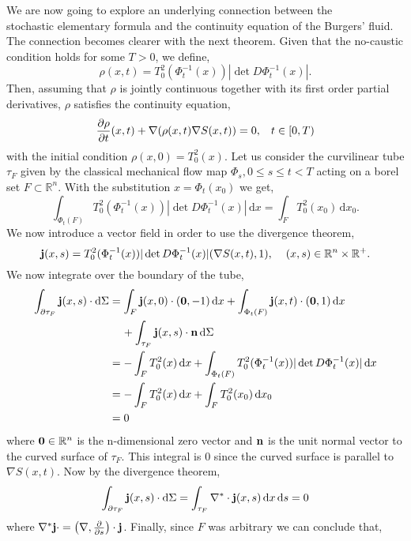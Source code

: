 \documentclass[a4paper,12pt,draft]{report}
\theoremstyle{remark}
\theoremstyle{definition}
\begin{document}
We are now going to explore an underlying connection between the \\stochastic elementary formula and the continuity equation of the Burgers' fluid.  The connection becomes clearer with the next theorem.
\theorem
{
Given that the no-caustic condition holds for some $T > 0$, we define,
$$
\rho(x, t) = T_0^2(\Phi_t^{-1}(x))|\det D\Phi_t^{-1}(x)|.
$$
Then, assuming that $\rho$ is jointly continuous together with its first order partial derivatives, $\rho$ satisfies the continuity equation,
$$
\frac{\partial \rho}{\partial t}(x, t) + \nabla(\rho(x, t)\nabla S(x, t)) = 0, \hspace{0.3cm} t \in [0, T)
$$
with the initial condition $\rho(x, 0) = T_0^2(x)$.
}
\proof
{
Let us consider the curvilinear tube $\tau_F$ given by the classical mechanical flow map $\Phi_s, 0 \le s\le t < T$ acting on a borel set $F \subset \mathbb{R}^n$.
With the substitution $x = \Phi_t(x_0)$ we get,
$$
\int_{\Phi_t(F)} T_0^2(\Phi_t^{-1}(x))|\det D\Phi_t^{-1}(x)|\,\mathrm{d}x = \int_F T_0^2(x_0)\,\mathrm{d}x_0.
$$
We now introduce a vector field in order to use the divergence theorem,
$$
\bold{j}(x, s) = T_0^2(\Phi_t^{-1}(x))|\det D\Phi_t^{-1}(x)|(\nabla S(x, t), 1), \hspace{0.4cm}(x, s) \in \mathbb{R}^n \times \mathbb{R}^+.
$$
We now integrate over the boundary of the tube,
\begin{align}
\int_{\partial \tau_F} \bold{j}(x, s)\cdot \mathrm{d}\Sigma & = \int_F \bold{j}(x, 0)\cdot(\bold{0}, -1)\,\mathrm{d}x + \int_{\Phi_t(F)} \bold{j}(x, t)\cdot(\bold{0}, 1)\,\mathrm{d}x \nonumber\\
& \hspace{0.4cm} + \int_{\tau_F} \bold{j}(x, s)\cdot \bold{n}\,\mathrm{d}\Sigma \nonumber\\
& = -\int_F T_0^2(x)\,\mathrm{d}x + \int_{\Phi_t(F)} T_0^2(\Phi_t^{-1}(x))|\det D\Phi_t^{-1}(x)|\,\mathrm{d}x\nonumber\\
& = -\int_F T_0^2(x)\,\mathrm{d}x + \int_F T_0^2(x_0)\,\mathrm{d}x_0\nonumber\\
& = 0\nonumber
\end{align}
where $\bold{0} \in \mathbb{R}^n$ is the n-dimensional zero vector and $\bold{n}$ is the unit normal vector to the curved surface of $\tau_F$.  This integral is $0$ since the curved surface is parallel to $\nabla S(x, t)$.  Now by the divergence theorem,
$$
\int_{\partial \tau_F} \bold{j}(x, s)\cdot \mathrm{d}\Sigma = \int_{\tau_F} \nabla^* \cdot \bold{j}(x, s)\,\mathrm{d}x\,\mathrm{d}s = 0
$$
where $\nabla^*\bold{j} \cdot = \left(\nabla, \frac{\partial}{\partial s}\right) \cdot\bold{j}$.  Finally, since $F$ was arbitrary we can conclude that,
}
\end{document}
